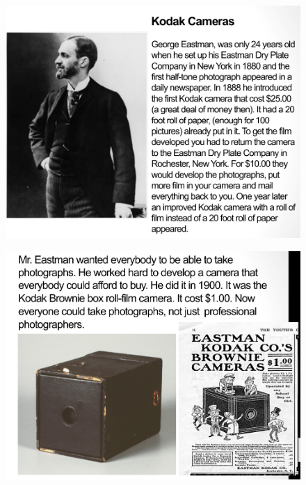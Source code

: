 \documentclass{beamer}
\begin{document}
\begin{frame}
	\begin{figure}
		\centering
		\includegraphics[scale=0.4]{102.jpg}
	\end{figure}
\end{frame}

\begin{frame}
	\begin{figure}
		\centering
		\includegraphics[scale=0.4]{103.jpg}
	\end{figure}
\end{frame}
\end{document}
